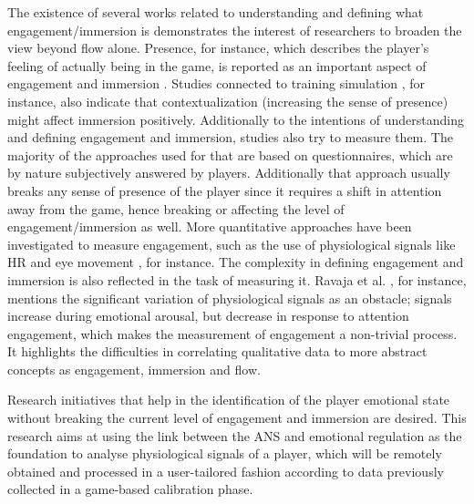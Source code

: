 The existence of several works \parencite{boyle2012engagement} related to understanding and defining what engagement/immersion is demonstrates the interest of researchers to broaden the view beyond flow alone. Presence, for instance, which describes the player's feeling of actually being in the game, is reported as an important aspect of engagement and immersion \parencite{weibel2011immersion}. Studies connected to training simulation \parencite{engstrom2016impact}, for instance, also indicate that contextualization (increasing the sense of presence) might affect immersion positively. Additionally to the intentions of understanding and defining engagement and immersion, studies also try to measure them. The majority of the approaches used for that are based on questionnaires, which are by nature subjectively answered by players. Additionally that approach usually breaks any sense of presence of the player since it requires a shift in attention away from the game, hence breaking or affecting the level of engagement/immersion as well. More quantitative approaches have been investigated to measure engagement, such as the use of physiological signals like HR \parencite{ravaja20051} and eye movement \parencite{jennett2008measuring}, for instance. The complexity in defining engagement and immersion is also reflected in the task of measuring it. Ravaja et al. \parencite{ravaja20051}, for instance, mentions the significant variation of physiological signals as an obstacle; signals increase during emotional arousal, but decrease in response to attention engagement, which makes the measurement of engagement a non-trivial process. It highlights the difficulties in correlating qualitative data to more abstract concepts as engagement, immersion and flow.

Research initiatives that help in the identification of the player emotional state without breaking the current level of engagement and immersion are desired. This research aims at using the link between the ANS and emotional regulation as the foundation to analyse physiological signals of a player, which will be remotely obtained and processed in a user-tailored fashion according to data previously collected in a game-based calibration phase.
